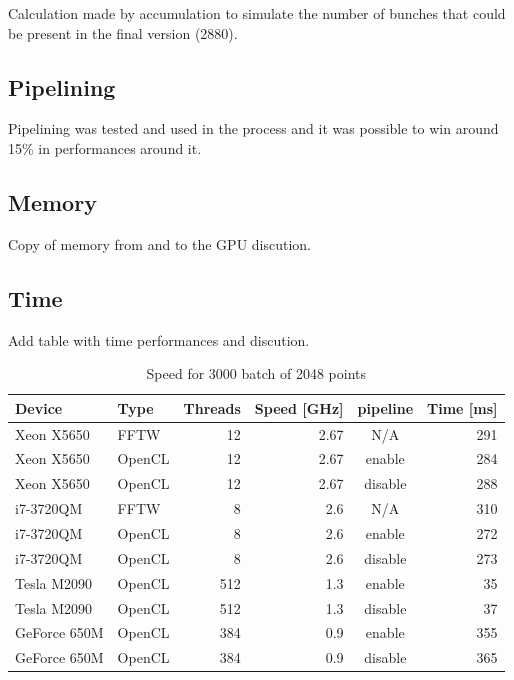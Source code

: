 Calculation made by accumulation to simulate the number of bunches that could be present in the final version (2880).

   \subsection{Pipelining}

	Pipelining was tested and used in the process and it was possible to win around 15\% in performances around it.

   \subsection{Memory}

	Copy of memory from and to the GPU discution.

   \subsection{Time}

	Add table with time performances and discution.

	\begin{table}[H]
		\caption{Speed for 3000 batch of 2048 points}
		\begin{tabular}{|l|lrrcr|}
			\hline
				Device & Type & Threads & Speed [GHz] & pipeline & Time [ms] \\
			\hline
			\hline
				Xeon X5650 & FFTW & 12 & 2.67 & N/A & 291 \\
				Xeon X5650 & OpenCL & 12 & 2.67 & enable & 284 \\
				Xeon X5650 & OpenCL & 12 & 2.67 & disable & 288 \\
			\hline
				i7-3720QM & FFTW & 8 & 2.6 & N/A & 310 \\
				i7-3720QM & OpenCL & 8 & 2.6 & enable & 272 \\
				i7-3720QM & OpenCL & 8 & 2.6 & disable & 273 \\
			\hline
			\hline
				Tesla M2090 & OpenCL & 512 & 1.3 & enable & 35 \\
				Tesla M2090 & OpenCL & 512 & 1.3 & disable & 37 \\
			\hline
				GeForce 650M & OpenCL & 384 & 0.9 & enable & 355 \\
				GeForce 650M & OpenCL & 384 & 0.9 & disable & 365 \\
			\hline
		\end{tabular}
	\end{table}


